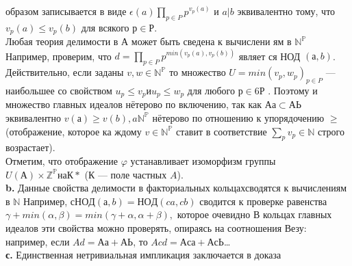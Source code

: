 образом записывается в виде $\epsilon(a) \prod_{p\in P}p^{v_{p}(a)}$ и $a | b$ эквивалентно тому,\linebreak
что $v_p(a) \leq v_{p}(b)$ для всякого $р \in Р$.\\
\hspace*{0pt}Любая теория делимости в А может быть сведена к вычислени­\linebreak
ям в $\mathbb{N^{P}}$ Например, проверим, что $d = \prod_{p \in P} p^{min(v_{p}(a),v_{p}(b))}$ являет­\linebreak
ся НОД $(а, b)$. Действительно, если заданы $v, w \in \mathbb{N^{P}}$ то множество \linebreak
$U = min(v_p, w_p)_{p \in P}$ --- наибольшее со свойством $u_p \leq v_p и u_p \leq w_p$\linebreak
для любого $р \in6 Р$ . Поэтому и множество главных идеалов нётерово \linebreak
по включению, так как $Аа \subset АЬ$ эквивалентно $v(а) \geq v(b), a \mathbb{N^{P}}$\linebreak
нётерово по отношению к упорядочению $\geq$ (отображение, которое ка­\linebreak
ждому $v \in \mathbb{N^{P}}$ ставит в соответствие $\sum_{p}v_p \in \mathbb{N}$ строго возрастает).\\
\hspace*{0pt} Отметим, что отображение $\varphi$ устанавливает изоморфизм группы\linebreak
$U(А) \times \mathbb{Z^{P}} на К*$ ($К$ — поле частных $A$).\\
\hspace*{15pt}\textbf{b.} Данные свойства делимости в факториальных кольцах\linebreak сводятся
к вычислениям в $\mathbb{N}$ Например, $сНОД(а, b) = НОД (ca,cb)$ сводится к\linebreak
проверке равенства $\gamma+min(\alpha, \beta) = min(\gamma+\alpha, \alpha+\beta),$ которое очевидно\linebreak
В кольцах главных идеалов эти свойства можно проверять, опираясь на\linebreak
соотношения Везу: например, если $Ad = Аа+АЬ$, то $Acd = Аса+АсЬ$\ldots \\
\newpage
\hspace*{15pt}\textbf{с.} Единственная нетривиальная импликация заключается в доказа­\linebreak
